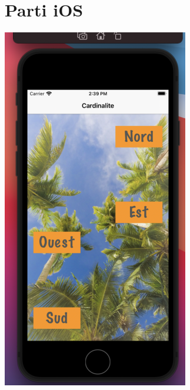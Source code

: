 \documentclass{article}
\begin{document}
{\color{brown}\section{Parti iOS}}
\begin{minipage}{0.4\textwidth}
\includegraphics[width=\textwidth]{ios1.png}
\end{minipage}
\end{document}
